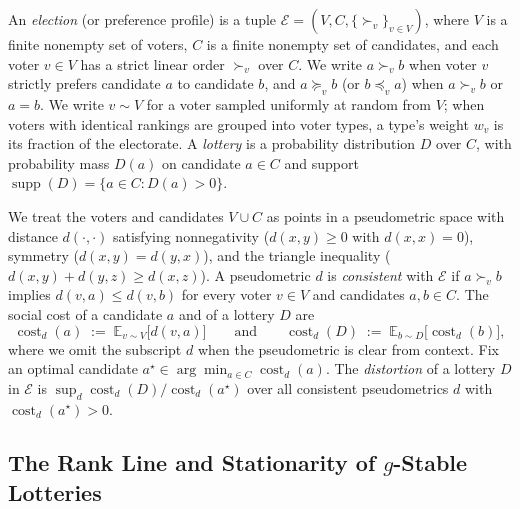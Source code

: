 \documentclass[11pt]{article}
\numberwithin{equation}{section}
\theoremstyle{plain}
\theoremstyle{definition}
\newcommand{\E}{\mathbb{E}}
\newcommand{\1}{\mathbf{1}}
\newcommand{\cost}{\operatorname{cost}}
\newcommand{\supp}{\operatorname{supp}}
\newcommand{\calE}{\mathcal{E}}
\begin{document}
An \emph{election} (or preference profile) is a tuple $\calE = (V, C, \{\succ_v\}_{v \in V})$, where $V$ is a finite nonempty set of voters, $C$ is a finite nonempty set of candidates, and each voter $v \in V$ has a strict linear order $\succ_v$ over $C$. We write $a \succ_v b$ when voter $v$ strictly prefers candidate $a$ to candidate $b$, and $a \succeq_v b$ (or $b \preceq_v a$) when $a \succ_v b$ or $a = b$. We write $v \sim V$ for a voter sampled uniformly at random from $V$; when voters with identical rankings are grouped into voter types, a type's weight $w_v$ is its fraction of the electorate. A \emph{lottery} is a probability distribution $D$ over $C$, with probability mass $D(a)$ on candidate $a \in C$ and support $\supp(D) = \{a \in C : D(a) > 0\}$.

We treat the voters and candidates $V \cup C$ as points in a pseudometric space with distance $d(\cdot, \cdot)$ satisfying nonnegativity ($d(x, y) \ge 0$ with $d(x, x) = 0$), symmetry ($d(x, y) = d(y, x)$), and the triangle inequality ($d(x, y) + d(y, z) \ge d(x, z)$). A pseudometric $d$ is \emph{consistent} with $\calE$ if $a \succ_v b$ implies $d(v, a) \le d(v, b)$ for every voter $v \in V$ and candidates $a, b \in C$. The social cost of a candidate $a$ and of a lottery $D$ are
\[
  \cost_d(a) \;:=\; \E_{v \sim V}\bigl[d(v, a)\bigr]
  \qquad\text{and}\qquad
  \cost_d(D) \;:=\; \E_{b \sim D}\bigl[\cost_d(b)\bigr],
\]
where we omit the subscript $d$ when the pseudometric is clear from context. Fix an optimal candidate $a^\star \in \arg\min_{a \in C} \cost_d(a)$. The \emph{distortion} of a lottery $D$ in $\calE$ is $\sup_d \cost_d(D) / \cost_d(a^\star)$ over all consistent pseudometrics $d$ with $\cost_d(a^\star) > 0$.

\subsection{The Rank Line and Stationarity of \texorpdfstring{$g$}{g}-Stable Lotteries}
\label{sec:rank-line}
\end{document}
